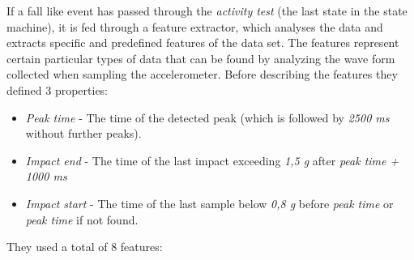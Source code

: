 \documentclass[12pt, a4paper, onecolumn]{article}
\begin{document}
	
	
	If a fall like event has passed through the  \textit{activity test} (the last state in the state machine), it is fed through a feature extractor, which analyses the data and extracts specific and predefined features of the data set. The features represent certain particular types of data that can be found by analyzing the wave form collected when sampling the accelerometer. Before describing the features they defined 3 properties:
	\begin{itemize}
		\item \textit{Peak time} - The time of the detected peak (which is followed by \textit{2500 ms} without further peaks).
		\item \textit{Impact end} - The time of the last impact exceeding \textit{1,5 g} after \textit{peak time + 1000 ms}
		\item  \textit{Impact start} - The time of the last sample below \textit{0,8 g} before \textit{peak time} or \textit{peak time} if not found. 
	\end{itemize}
	They used a total of 8 features:
	
\end{document}
